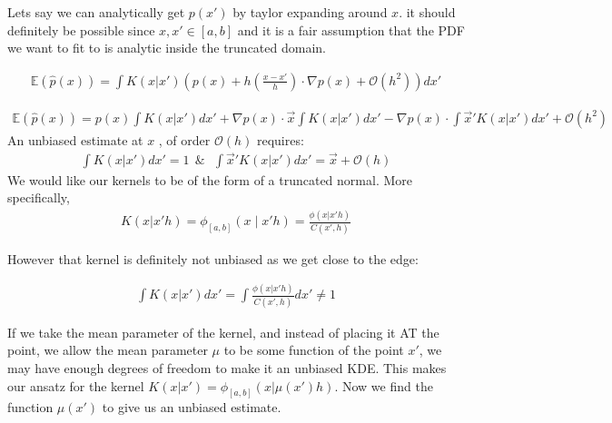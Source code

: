\documentclass[twocolumn,usenames,dvipsnames,linenumbers]{aastex631}
\newcommand{\grad}{\nabla}
\begin{document}
Lets say we can analytically get $p(x')$ by taylor expanding around $x$. it should definitely be possible since $x,x' \in [a,b]$ and it is a fair assumption that the PDF we want to fit to is analytic inside the truncated domain. 

\begin{equation}
\begin{aligned}
	\mathbb{E}(\hat{p}(x)) = \int K(x | x')\left( p(x) + h(\frac{x-x'}{h})\cdot\grad p(x) + \mathcal{O}(h^2)   \right)dx'
\end{aligned}
\end{equation}


\begin{equation}
\begin{aligned}
	\mathbb{E}(\hat{p}(x)) = p(x)\int K(x | x')dx' + \grad p(x)\cdot \vec{x}\int K(x | x')dx' - \grad p(x)\cdot\int \vec{x}'K(x | x')dx' + \mathcal{O}(h^2)
\end{aligned}
\end{equation}
An unbiased estimate at $x$ , of order $\mathcal{O}(h)$ requires:
\begin{equation}
\begin{aligned}
	\int K(x | x')dx' = 1 \ \ \& \ \ \ \int \vec{x}'K(x | x')dx' = \vec{x} + \mathcal{O}(h)
\end{aligned}
\end{equation}
We would like our kernels to be of the form of a truncated normal. More specifically, 
\begin{equation}
	\begin{aligned}
		K(x | x' h) = \phi_{[a,b]}(x\mid x' h) = \frac{\phi(x | x' h)}{C(x', h)}
	\end{aligned}
\end{equation}

However that kernel is definitely not unbiased as we get close to the edge:

\begin{equation}
\begin{aligned}
	\int K(x | x')dx' = \int \frac{\phi(x | x' h)}{C(x', h)}dx' \neq 1
\end{aligned}
\end{equation}
	
If we take the mean parameter of the kernel, and instead of placing it AT the point, we allow the mean parameter $\mu$ to be some function of the point $x'$, we may have enough degrees of freedom to make it an unbiased KDE. This makes our ansatz for the kernel $K(x | x') = \phi_{[a,b]}(x | \mu(x') h)$. Now we find the function $\mu(x')$ to give us an unbiased estimate.
\end{document}
